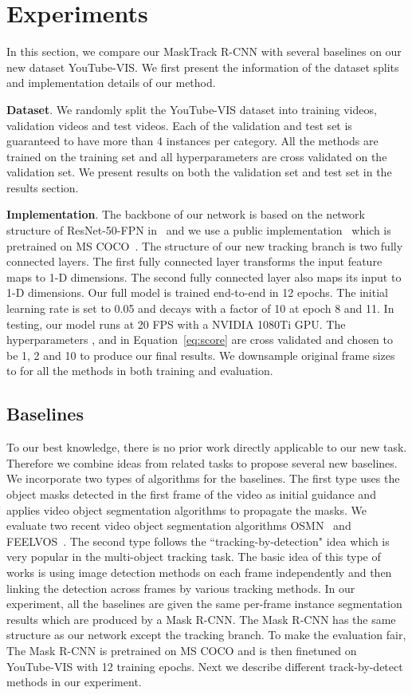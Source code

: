 \section{Experiments}\label{sec:experiment}


In this section, we compare our MaskTrack R-CNN with several baselines on our new dataset YouTube-VIS. We first present the information of the dataset splits and implementation details of our method. 

\noindent\textbf{Dataset}. We randomly split the YouTube-VIS dataset into  training videos,  validation videos and  test videos. Each of the validation and test set is guaranteed to have more than 4 instances per category. All the methods are trained on the training set and all hyperparameters are cross validated on the validation set. We present results on both the validation set and test set in the results section. 

\noindent\textbf{Implementation}. The backbone of our network is based on the network structure of ResNet-50-FPN in~\cite{he2018maskrcnn} and we use a public implementation~\cite{mmdetection2018} which is pretrained on MS COCO~\cite{lin2014mscoco}. The structure of our new tracking branch is two fully connected layers. The first fully connected layer transforms the  input feature maps to 1-D  dimensions. The second fully connected layer also maps its input to 1-D  dimensions. Our full model is trained end-to-end in 12 epochs. The initial learning rate is set to 0.05 and decays with a factor of 10 at epoch 8 and 11. In testing, our model runs at 20 FPS with a NVIDIA 1080Ti GPU. The hyperparameters ,  and  in Equation~\ref{eq:score} are cross validated and chosen to be 1, 2 and 10 to produce our final results. We downsample original frame sizes to  for all the methods in both training and evaluation.

\subsection{Baselines} 
To our best knowledge, there is no prior work directly applicable to our new task. Therefore we combine ideas from related tasks to propose several new baselines. We incorporate two types of algorithms for the baselines. The first type uses the object masks detected in the first frame of the video as initial guidance and applies video object segmentation algorithms to propagate the masks. We evaluate two recent video object segmentation algorithms OSMN~\cite{Yang2018osmn} and FEELVOS~\cite{voigtlaender2019feelvos}. The second type follows the ``tracking-by-detection" idea which is very popular in the multi-object tracking task. The basic idea of this type of works is using image detection methods on each frame independently and then linking the detection across frames by various tracking methods. In our experiment, all the baselines are given the same per-frame instance segmentation results which are produced by a Mask R-CNN. The Mask R-CNN has the same structure as our network except the tracking branch. To make the evaluation fair, The Mask R-CNN is pretrained on MS COCO and is then finetuned on YouTube-VIS with 12 training epochs. Next we describe different track-by-detect methods in our experiment.

